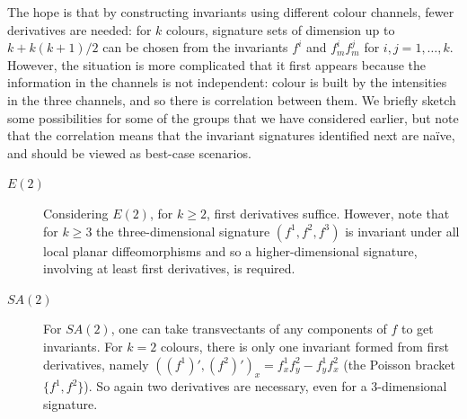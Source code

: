 \documentclass[review,onefignum,onetabnum]{siamonline190516}
\begin{document}
The hope is that by constructing invariants using different colour channels, fewer derivatives are needed: for $k$ colours, signature sets of dimension up to $k + k(k+1)/2$ can be chosen from the invariants $f^i$ and $f^i_m f^j_m$ for $i,j=1,\dots, k$. However, the situation is more complicated that it first appears because the information in the channels is not independent: colour is built by the intensities in the three channels, and so there is correlation between them. We briefly sketch some possibilities for some of the groups that we have considered earlier, but note that the correlation means that the invariant signatures identified next are na\"ive, and should be viewed as best-case scenarios. 

\begin{description}
\item[$E(2)$]
Considering $E(2)$, for $k\ge 2$, first derivatives suffice. However, note that for $k\ge 3$ the three-dimensional signature $(f^1,f^2,f^3)$ is invariant under all local planar diffeomorphisms and so a higher-dimensional signature, involving at least first derivatives, is required.
\item[$SA(2)$]
For $SA(2)$, one can take transvectants of any components of $f$ to get invariants. For $k=2$ colours, there is only one  invariant formed from first derivatives, namely $((f^1)',(f^2)')_x = f^1_x f^2_y - f^1_y f^2_x$ (the Poisson bracket $\{f^1,f^2\}$). So again two derivatives are necessary, even for a 3-dimensional signature.


\end{description}
\end{document}
